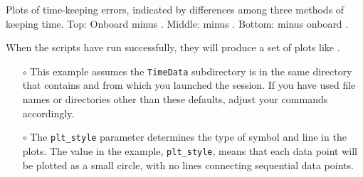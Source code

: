 \begin{enumerate}
	\smallskip
	\begin{marginfigure}[-19.cm]
		\begin{center}
			\caption[Plots of time-keeping errors]{Plots of time-keeping errors, indicated by differences among three methods of keeping time. 
			Top: Onboard \rtc minus  \rtc. Middle: \ntp minus  \rtc. Bottom: \ntp minus onboard \rtc. }
		\end{center}
	\end{marginfigure}
	
	When the scripts have run successfully, they will produce a set of plots like .
	\begin{itemize}
		\item[$\circ$] This example assumes the \lstinline{TimeData} subdirectory is in the same directory that contains  and from which you launched the \python session.
		If you have used file names or directories other than these defaults, adjust your commands accordingly. 
		\item[$\circ$] The \lstinline{plt_style} parameter determines the type of symbol and line in the plots. 
		The value in the example, \lstinline{plt_style}, means that each data point will be plotted as a small circle, with no lines connecting sequential data points.
	\end{itemize}


\end{enumerate}
